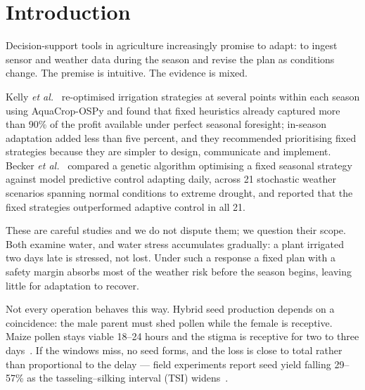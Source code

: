 \documentclass[10pt,twocolumn]{article}
\begin{document}
\vspace{2pt}
\vspace{6pt}

\section{Introduction}

Decision-support tools in agriculture increasingly promise to adapt: to
ingest sensor and weather data during the season and revise the plan as
conditions change. The premise is intuitive. The evidence is mixed.

Kelly \textit{et al.}~\cite{kelly2023} re-optimised irrigation strategies at
several points within each season using AquaCrop-OSPy and found that fixed
heuristics already captured more than 90\% of the profit available under
perfect seasonal foresight; in-season adaptation added less than five percent,
and they recommended prioritising fixed strategies because they are simpler to
design, communicate and implement. Becker \textit{et al.}~\cite{becker2026}
compared a genetic algorithm optimising a fixed seasonal strategy against
model predictive control adapting daily, across 21 stochastic weather
scenarios spanning normal conditions to extreme drought, and reported that the
fixed strategies outperformed adaptive control in all 21.

These are careful studies and we do not dispute them; we question their
scope. Both examine water, and water stress accumulates gradually: a plant
irrigated two days late is stressed, not lost. Under such a response a fixed
plan with a safety margin absorbs most of the weather risk before the season
begins, leaving little for adaptation to recover.

Not every operation behaves this way. Hybrid seed production depends on a
coincidence: the male parent must shed pollen while the female is receptive.
Maize pollen stays viable 18--24 hours and the stigma is receptive for two to
three days~\cite{marahatta2025}. If the windows miss, no seed forms, and the
loss is close to total rather than proportional to the delay --- field
experiments report seed yield falling 29--57\% as the tasseling--silking
interval (TSI) widens~\cite{marahatta2025}.
\end{document}
